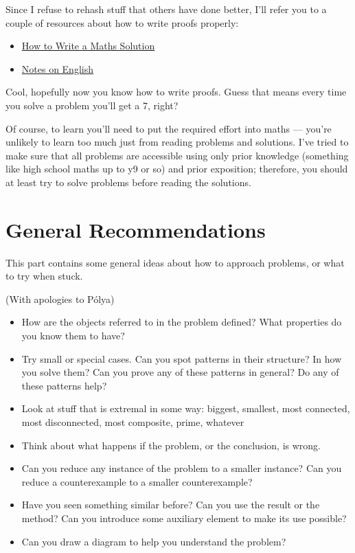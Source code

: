 \documentclass{amsart}
\begin{document}
Since I refuse to rehash stuff that others have done better, I'll refer you to a
couple of resources about how to write proofs properly:
\begin{itemize}
  \item
    \href{https://artofproblemsolving.com/news/articles/how-to-write-a-solution}
    {How to Write a Maths Solution}
  \item \href{https://web.evanchen.cc/handouts/english/english.pdf}{Notes on
    English}
\end{itemize}
Cool, hopefully now you know how to write proofs. Guess that means every time 
you solve a problem you'll get a 7, right?

Of course, to learn you'll need to put the required effort into maths --- you're
unlikely to learn too much just from reading problems and solutions. I've
tried to make sure that all problems are accessible using only prior knowledge
(something like high school maths up to y9 or so) and prior exposition;
therefore, you should at least try to solve problems before reading the
solutions.
\newpage
\part{General Recommendations}
This part contains some general ideas about how to approach problems, or what to
try when stuck.

(With apologies to P\'olya)
\begin{itemize}
  \item How are the objects referred to in the problem defined? What properties
    do you know them to have?
  \item Try small or special cases. Can you spot patterns in their structure? In
    how you solve them? Can you prove any of these patterns in general? Do any
    of these patterns help?
  \item Look at stuff that is extremal in some way: biggest, smallest, most
    connected, most disconnected, most composite, prime, whatever
  \item Think about what happens if the problem, or the conclusion, is wrong.
  \item Can you reduce any instance of the problem to a smaller instance? 
    Can you reduce a counterexample to a smaller counterexample?
  \item Have you seen something similar before? Can you use the result or the
    method? Can you introduce some auxiliary element to make its use possible?
  \item Can you draw a diagram to help you understand the problem?
\end{itemize}
\newpage
\end{document}
